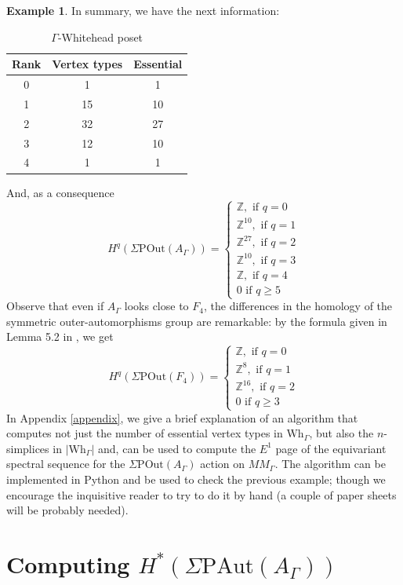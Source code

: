 \documentclass[a4paper]{amsart}
\newcommand{\G}{\Gamma}
\newcommand{\A}{{A_\Gamma}}
\newcommand{\PAut}{\Sigma\mathrm{PAut}}
\newcommand{\POut}{\Sigma\mathrm{POut}}
\newcommand{\Wh}{\mathrm{Wh}}
\theoremstyle{definition}
\newtheorem{ej}[teo]{Example}
\theoremstyle{remark}
\begin{document}
\begin{ej}
    In summary, we have the next information:
    \begin{table}[h]
\centering
\begin{tabular}{|c|c|c|}
\hline
\textbf{Rank} & \textbf{Vertex types} & \textbf{Essential} \\
\hline
0 & 1 & 1 \\
1 & 15 & 10 \\
2 & 32 & 27 \\
3 & 12 & 10 \\
4 & 1 & 1 \\
\hline
\end{tabular}
\caption{$\Gamma$-Whitehead poset}
\label{tab:whitehead_poset}
\end{table}

And, as a consequence
$$
H^q(\POut(\A))=\begin{cases}
    \mathbb{Z}, \textrm{ if } q=0 \\
    \mathbb{Z}^{10}, \textrm{ if } q=1 \\
    \mathbb{Z}^{27}, \textrm{ if } q=2 \\
    \mathbb{Z}^{10}, \textrm{ if } q=3 \\
    \mathbb{Z}, \textrm{ if } q=4 \\
    0 \textrm{ if } q\geq 5
\end{cases}
$$
Observe that even if $\A$ looks close to $F_4$, the differences in the homology of the symmetric outer-automorphisms group are remarkable:  by the formula given in Lemma 5.2 in \cite{JMcCM}, we get 
$$
H^q(\POut(F_4))=\begin{cases}
    \mathbb{Z}, \textrm{ if } q=0 \\
    \mathbb{Z}^{8}, \textrm{ if } q=1 \\
    \mathbb{Z}^{16}, \textrm{ if } q=2 \\
    0 \textrm{ if } q\geq 3 
\end{cases}
$$
In Appendix \ref{appendix}, we give a brief explanation of  an algorithm that computes not just the number of essential vertex types in $\Wh_\G$, but also the $n$-simplices in $|\Wh_\G|$ and, can be used to compute the $E^1$ page of the equivariant spectral sequence for the $\POut(A_\G)$ action on $MM_\G$. The algorithm can be implemented in Python and be used to check the previous example; though we encourage the inquisitive reader to try to do it by hand (a couple of paper sheets will be probably needed).
\end{ej}


\section{Computing $H^*(\PAut(A_\G))$}\label{sec:PSA}
\end{document}
